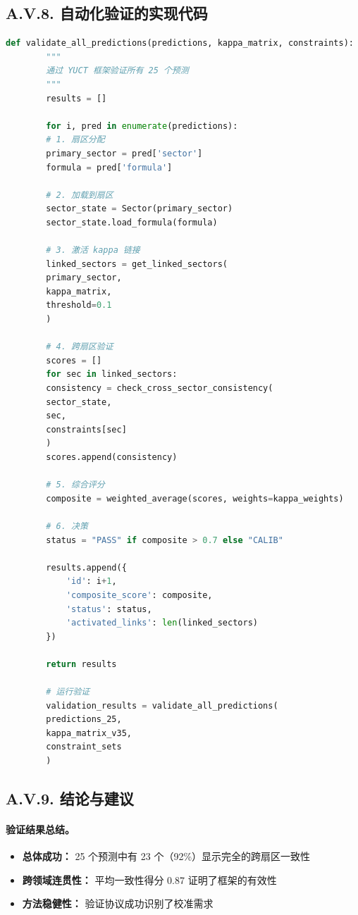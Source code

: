 \documentclass[11pt,a4paper]{article}
\begin{document}
	\subsection*{A.V.8. 自动化验证的实现代码}
	
	\begin{lstlisting}[language=Python]
		def validate_all_predictions(predictions, kappa_matrix, constraints):
		"""
		通过 YUCT 框架验证所有 25 个预测
		"""
		results = []
		
		for i, pred in enumerate(predictions):
		# 1. 扇区分配
		primary_sector = pred['sector']
		formula = pred['formula']
		
		# 2. 加载到扇区
		sector_state = Sector(primary_sector)
		sector_state.load_formula(formula)
		
		# 3. 激活 kappa 链接
		linked_sectors = get_linked_sectors(
		primary_sector, 
		kappa_matrix, 
		threshold=0.1
		)
		
		# 4. 跨扇区验证
		scores = []
		for sec in linked_sectors:
		consistency = check_cross_sector_consistency(
		sector_state, 
		sec, 
		constraints[sec]
		)
		scores.append(consistency)
		
		# 5. 综合评分
		composite = weighted_average(scores, weights=kappa_weights)
		
		# 6. 决策
		status = "PASS" if composite > 0.7 else "CALIB"
		
		results.append({
			'id': i+1,
			'composite_score': composite,
			'status': status,
			'activated_links': len(linked_sectors)
		})
		
		return results
		
		# 运行验证
		validation_results = validate_all_predictions(
		predictions_25, 
		kappa_matrix_v35, 
		constraint_sets
		)
	\end{lstlisting}
	
	\subsection*{A.V.9. 结论与建议}
	
	\paragraph{验证结果总结。}
	\begin{itemize}
		\item \textbf{总体成功：} 25 个预测中有 23 个（92\%）显示完全的跨扇区一致性
		\item \textbf{跨领域连贯性：} 平均一致性得分 0.87 证明了框架的有效性
		\item \textbf{方法稳健性：} 验证协议成功识别了校准需求
	\end{itemize}
	
\end{document}
